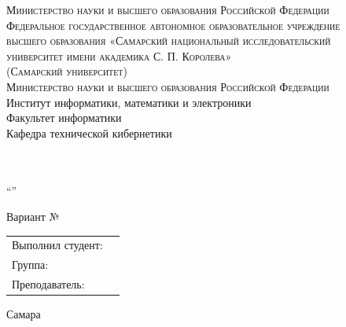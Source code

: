 \begin{titlepage}

	\center


	\textsc{Министерство науки и высшего образования Российской Федерации}\\[-0.15cm]
	\textsc{Федеральное государственное автономное образовательное учреждение}\\[-0.15cm]
	\textsc{высшего образования «Самарский национальный исследовательский}\\[-0.15cm]
	\textsc{университет имени академика С. П. Королева»}\\[-0.15cm]
	\textsc{(Самарский университет)}\\[-0.15cm]

	\textsc{Министерство науки и высшего образования Российской Федерации}\\[1cm]
    {Институт информатики, математики и электроники}\\[-0.2cm]
    {Факультет информатики}\\[-0.2cm]
    {Кафедра технической кибернетики}\\[0.5cm]

	\vfill\vfill


	{\large \textbf{\subjectTitle}}\\[0.3cm]

	{\large \taskTitle}\\[0.5cm]

    {\large \enquote{\textbf{\theme}}}\\[0.5cm]

    \vfill
     
     {Вариант № \variantNumber}\\[0.5cm]

	\vfill\vfill

	\begin{minipage}{1\textwidth}
		\begin{center}
			\begin{tabularx}{\textwidth}{X l}
				Выполнил студент:        & \firstAuthorSurName \firstAuthorInitials \\
				Группа:                  & \groupNumber                     		   \\
				Преподаватель:           & \teacherName         		                \\
			\end{tabularx}
		\end{center}
	\end{minipage}



	\vfill\vfill\vfill

	{\centering Самара \the\year}


\end{titlepage}

